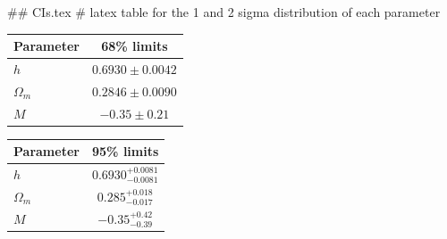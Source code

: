 ## CIs.tex
# latex table for the 1 and 2 sigma distribution of each parameter

\begin{tabular} { l  c}
 Parameter &  68\% limits\\
\hline
{\boldmath$h              $} & $0.6930\pm 0.0042          $\\
{\boldmath$\Omega_m       $} & $0.2846\pm 0.0090          $\\
{\boldmath$M              $} & $-0.35\pm 0.21             $\\
\hline
\end{tabular}

\begin{tabular} { l  c}
 Parameter &  95\% limits\\
\hline
{\boldmath$h              $} & $0.6930^{+0.0081}_{-0.0081}$\\
{\boldmath$\Omega_m       $} & $0.285^{+0.018}_{-0.017}   $\\
{\boldmath$M              $} & $-0.35^{+0.42}_{-0.39}     $\\
\hline
\end{tabular}
